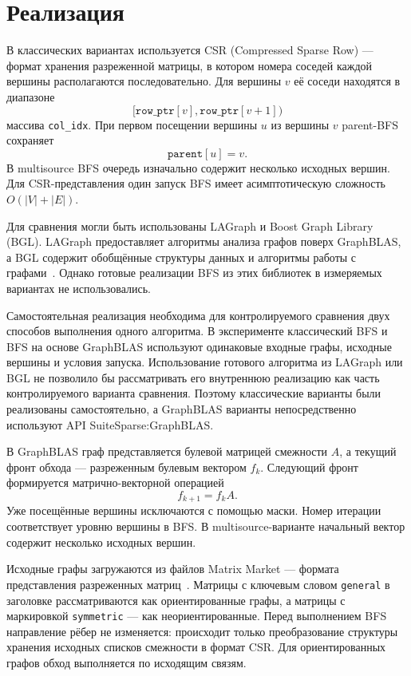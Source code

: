 \documentclass[a4paper,10pt]{article}
\begin{document}
\section{Реализация}

В классических вариантах используется CSR (Compressed Sparse Row) ---
формат хранения разреженной матрицы, в котором номера соседей каждой
вершины располагаются последовательно. Для вершины $v$ её соседи
находятся в диапазоне
\[
[\texttt{row\_ptr}[v],\texttt{row\_ptr}[v+1])
\]
массива \texttt{col\_idx}. При первом посещении вершины $u$ из вершины
$v$ parent-BFS сохраняет
\[
\texttt{parent}[u]=v.
\]
В multisource BFS очередь изначально содержит несколько исходных
вершин. Для CSR-представления один запуск BFS имеет асимптотическую
сложность $O(|V|+|E|)$.

Для сравнения могли быть использованы LAGraph и
Boost Graph Library (BGL). LAGraph предоставляет алгоритмы анализа
графов поверх GraphBLAS, а BGL содержит обобщённые структуры данных и
алгоритмы работы с графами~\cite{lagraph,boost-graph}. Однако готовые
реализации BFS из этих библиотек в измеряемых вариантах не
использовались.

Самостоятельная реализация необходима для контролируемого сравнения
двух способов выполнения одного алгоритма. В эксперименте классический
BFS и BFS на основе GraphBLAS используют одинаковые входные графы,
исходные вершины и условия запуска. Использование готового алгоритма
из LAGraph или BGL не позволило бы рассматривать его внутреннюю
реализацию как часть контролируемого варианта сравнения. Поэтому
классические варианты были реализованы самостоятельно, а GraphBLAS
варианты непосредственно используют API SuiteSparse:GraphBLAS.

В GraphBLAS граф представляется булевой матрицей смежности $A$, а
текущий фронт обхода --- разреженным булевым вектором $f_k$. Следующий
фронт формируется матрично-векторной операцией
\[
f_{k+1}=f_k A.
\]
Уже посещённые вершины исключаются с помощью маски. Номер итерации
соответствует уровню вершины в BFS. В multisource-варианте начальный
вектор содержит несколько исходных вершин.

Исходные графы загружаются из файлов Matrix Market --- формата
представления разреженных матриц~\cite{ssmc}. Матрицы с ключевым словом
\texttt{general} в заголовке рассматриваются как ориентированные
графы, а матрицы с маркировкой \texttt{symmetric} --- как
неориентированные. Перед выполнением BFS направление рёбер не
изменяется: происходит только преобразование структуры хранения
исходных списков смежности в формат CSR. Для ориентированных графов
обход выполняется по исходящим связям.
\end{document}
